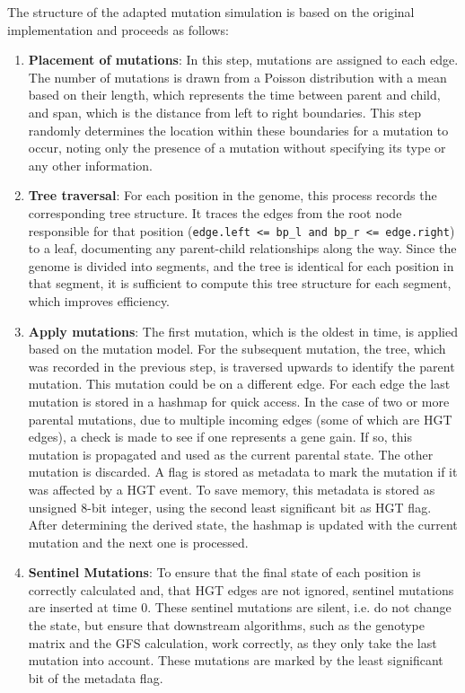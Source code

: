 The structure of the adapted mutation simulation is based on the original implementation and proceeds as follows:

\begin{enumerate}
    \item \textbf{Placement of mutations}: In this step, mutations are assigned to each edge.
          The number of mutations is drawn from a Poisson distribution with a mean based on their length, which represents the time between parent and child, and span, which is the distance from left to right boundaries.
          This step randomly determines the location within these boundaries for a mutation to occur, noting only the presence of a mutation without specifying its type or any other information.
          \newpage
    \item \textbf{Tree traversal}:  For each position in the genome, this process records the corresponding tree structure.
          It traces the edges from the root node responsible for that position (\texttt{edge.left <= bp_l and bp_r <= edge.right}) to a leaf, documenting any parent-child relationships along the way.
          Since the genome is divided into segments, and the tree is identical for each position in that segment, it is sufficient to compute this tree structure for each segment, which improves efficiency.
    \item \textbf{Apply mutations}: The first mutation, which is the oldest in time, is applied based on the mutation model.
          For the subsequent mutation, the tree, which was recorded in the previous step, is traversed upwards to identify the parent mutation.
          This mutation could be on a different edge.
          For each edge the last mutation is stored in a hashmap for quick access.
          In the case of two or more parental mutations, due to multiple incoming edges (some of which are \ac{HGT} edges), a check is made to see if one represents a gene gain.
          If so, this mutation is propagated and used as the current parental state.
          The other mutation is discarded.
          A flag is stored as metadata to mark the mutation if it was affected by a \ac{HGT} event.
          To save memory, this metadata is stored as unsigned 8-bit integer, using the second least significant bit as \ac{HGT} flag.
          After determining the derived state, the hashmap is updated with the current mutation and the next one is processed.

    \item \textbf{Sentinel Mutations}: To ensure that the final state of each position is correctly calculated and, that \ac{HGT} edges are not ignored, sentinel mutations are inserted at time 0.
          These sentinel mutations are silent, i.e.
          do not change the state, but ensure that downstream algorithms, such as the genotype matrix and the GFS calculation, work correctly, as they only take the last mutation into account.
          These mutations are marked by the least significant bit of the metadata flag.


\end{enumerate}
